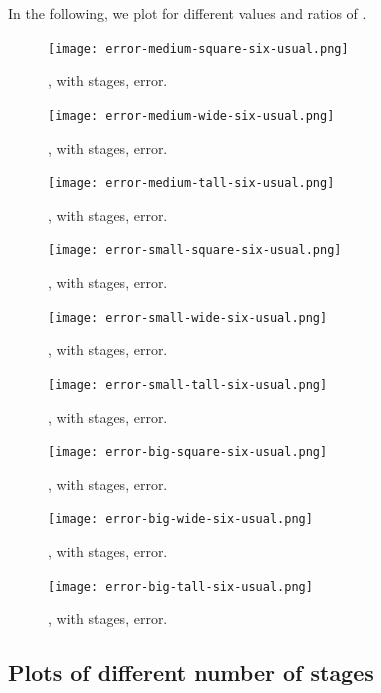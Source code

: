 In the following, we plot for different values and ratios of .
%
\begin {figure} [H]
\texttt{[image: error-medium-square-six-usual.png]}
\caption {, with  stages, error.}
\end {figure}
%
\begin {figure} [H]
\texttt{[image: error-medium-wide-six-usual.png]}
\caption {, with  stages, error.}
\end {figure}
%
\begin {figure} [H]
\texttt{[image: error-medium-tall-six-usual.png]}
\caption {, with  stages, error.}
\end {figure}
%
\begin {figure} [H]
\texttt{[image: error-small-square-six-usual.png]}
\caption {, with  stages, error.}
\end {figure}
%
\begin {figure} [H]
\texttt{[image: error-small-wide-six-usual.png]}
\caption {, with  stages, error.}
\end {figure}
%
\begin {figure} [H]
\texttt{[image: error-small-tall-six-usual.png]}
\caption {, with  stages, error.}
\end {figure}
%
\begin {figure} [H]
\texttt{[image: error-big-square-six-usual.png]}
\caption {, with  stages, error.}
\end {figure}
%
\begin {figure} [H]
\texttt{[image: error-big-wide-six-usual.png]}
\caption {, with  stages, error.}
\end {figure}
%
\begin {figure} [H]
\texttt{[image: error-big-tall-six-usual.png]}
\caption {, with  stages, error.}
\end {figure}

\subsection {Plots of different number of stages}


